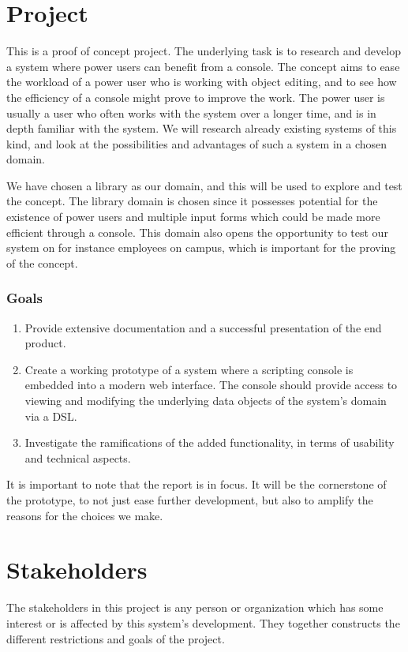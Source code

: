 \section{Project}
This is a proof of concept project. The underlying task is to research and develop a system where power users can benefit from a console.  The concept aims to ease the workload of a power user who is working with object editing, and to see how the efficiency of a console might prove to improve the work. The power user is usually a user who often works with the system over a longer time, and is in depth familiar with the system. We will research already existing systems of this kind, and look at the possibilities and advantages of such a system in a chosen domain.

We have chosen a library as our domain, and this will be used to explore and test the concept. The library domain is chosen since it possesses potential for the existence of power users and multiple input forms which could be made more efficient through a console. This domain also opens the opportunity to test our system on for instance employees on campus, which is important for the proving of the concept.
\subsubsection{Goals}
\begin{enumerate}
  \item Provide extensive documentation and a successful presentation of the end product.
  \item Create a working prototype of a system where a scripting console is embedded into a modern web interface. The console should provide access to viewing and modifying the underlying data objects of the system's domain via a DSL.
  \item Investigate the ramifications of the added functionality, in terms of usability and technical aspects.
\end{enumerate}

It is important to note that the report is in focus. It will be the cornerstone of the prototype, to not just ease further development, but also to amplify the reasons for the choices we make.

\section{Stakeholders}
The stakeholders in this project is any person or organization which has some interest or is affected by this system's development. They together constructs the different restrictions and goals of the project.

